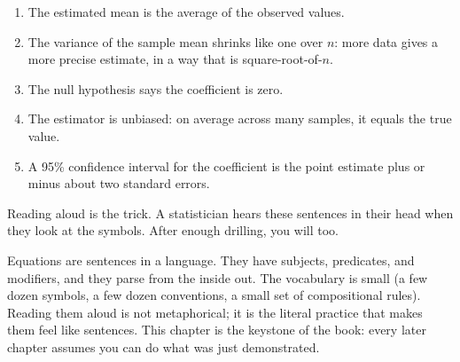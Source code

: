 \documentclass[
  letterpaper,
  11pt,
  twoside,
  openany]{scrbook}
\providecommand{\tightlist}{%
  \setlength{\itemsep}{0pt}\setlength{\parskip}{0pt}}
\begin{document}
\begin{enumerate}
\def\labelenumi{\arabic{enumi}.}
\tightlist
\item
  The estimated mean is the average of the observed values.
\item
  The variance of the sample mean shrinks like one over \(n\): more data
  gives a more precise estimate, in a way that is square-root-of-\(n\).
\item
  The null hypothesis says the coefficient is zero.
\item
  The estimator is unbiased: on average across many samples, it equals
  the true value.
\item
  A 95\% confidence interval for the coefficient is the point estimate
  plus or minus about two standard errors.
\end{enumerate}

Reading aloud is the trick. A statistician hears these sentences in
their head when they look at the symbols. After enough drilling, you
will too.

\begin{tcolorbox}[enhanced jigsaw, arc=.35mm, bottomrule=.15mm, bottomtitle=1mm, breakable, colback=white, colbacktitle=quarto-callout-warning-color!10!white, colframe=quarto-callout-warning-color-frame, coltitle=black, left=2mm, leftrule=.75mm, opacityback=0, opacitybacktitle=0.6, rightrule=.15mm, title=\textcolor{quarto-callout-warning-color}{\faExclamationTriangle}\hspace{0.5em}{Key insight}, titlerule=0mm, toprule=.15mm, toptitle=1mm]

Equations are sentences in a language. They have subjects, predicates,
and modifiers, and they parse from the inside out. The vocabulary is
small (a few dozen symbols, a few dozen conventions, a small set of
compositional rules). Reading them aloud is not metaphorical; it is the
literal practice that makes them feel like sentences. This chapter is
the keystone of the book: every later chapter assumes you can do what
was just demonstrated.

\end{tcolorbox}
\end{document}
